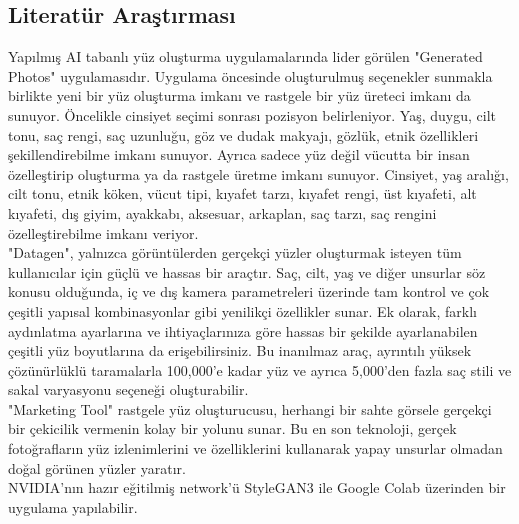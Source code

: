 \documentclass[12pt, a4paper]{article}
\begin{document}
\begin{center}
		\section{Literatür Araştırması}
\end{center}
	\begin{flushleft}
	Yapılmış AI tabanlı yüz oluşturma uygulamalarında lider görülen "Generated Photos\cite{Generated-2024-03-08}" uygulamasıdır. Uygulama öncesinde oluşturulmuş seçenekler sunmakla birlikte yeni bir yüz oluşturma imkanı ve rastgele bir yüz üreteci imkanı da sunuyor. Öncelikle cinsiyet seçimi sonrası pozisyon belirleniyor.
	Yaş, duygu, cilt tonu, saç rengi, saç uzunluğu, göz ve dudak makyajı, gözlük, etnik özellikleri şekillendirebilme imkanı sunuyor. Ayrıca sadece yüz değil vücutta bir insan özelleştirip oluşturma ya da rastgele üretme imkanı sunuyor. Cinsiyet, yaş aralığı, cilt tonu, etnik köken, vücut tipi, kıyafet tarzı, kıyafet rengi, üst kıyafeti, alt kıyafeti, dış giyim, ayakkabı, aksesuar, arkaplan, saç tarzı, saç rengini özelleştirebilme imkanı veriyor.
	\\"Datagen\cite{Datagen-2024-03-08}", yalnızca görüntülerden gerçekçi yüzler oluşturmak isteyen tüm kullanıcılar için güçlü ve hassas bir araçtır. Saç, cilt, yaş ve diğer unsurlar söz konusu olduğunda, iç ve dış kamera parametreleri üzerinde tam kontrol ve çok çeşitli yapısal kombinasyonlar gibi yenilikçi özellikler sunar.
	Ek olarak, farklı aydınlatma ayarlarına ve ihtiyaçlarınıza göre hassas bir şekilde ayarlanabilen çeşitli yüz boyutlarına da erişebilirsiniz. Bu inanılmaz araç, ayrıntılı yüksek çözünürlüklü taramalarla 100,000'e kadar yüz ve ayrıca 5,000'den fazla saç stili ve sakal varyasyonu seçeneği oluşturabilir\cite{shadmi2021using}\cite{yudkin2022hands}.
	\\ "Marketing Tool\cite{Random-2024-03-10}" rastgele yüz oluşturucusu, herhangi bir sahte görsele gerçekçi bir çekicilik vermenin kolay bir yolunu sunar. Bu en son teknoloji, gerçek fotoğrafların yüz izlenimlerini ve özelliklerini kullanarak yapay unsurlar olmadan doğal görünen yüzler yaratır.
		\\NVIDIA'nın hazır eğitilmiş network'ü StyleGAN3 ile Google Colab üzerinden bir uygulama yapılabilir.\cite{heaton2020applications}
	

\end{flushleft}
\end{document}
